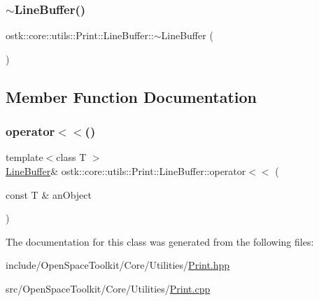 \mbox{\label{classostk_1_1core_1_1utils_1_1_print_1_1_line_buffer_a4e41e82cf1085cdb1db3289b58305526}} 
\subsubsection{\texorpdfstring{$\sim$\+Line\+Buffer()}{~LineBuffer()}}
{\footnotesize\ttfamily ostk\+::core\+::utils\+::\+Print\+::\+Line\+Buffer\+::$\sim$\+Line\+Buffer (\begin{DoxyParamCaption}{ }\end{DoxyParamCaption})}



\subsection{Member Function Documentation}
\mbox{\label{classostk_1_1core_1_1utils_1_1_print_1_1_line_buffer_ac7609b62d8623d0f8717acc4c5102faf}} 
\subsubsection{\texorpdfstring{operator$<$$<$()}{operator<<()}}
{\footnotesize\ttfamily template$<$class T $>$ \\
\hyperlink{classostk_1_1core_1_1utils_1_1_print_1_1_line_buffer}{Line\+Buffer}\& ostk\+::core\+::utils\+::\+Print\+::\+Line\+Buffer\+::operator$<$$<$ (\begin{DoxyParamCaption}\item[{const T \&}]{an\+Object }\end{DoxyParamCaption})\hspace{0.3cm}{\ttfamily [inline]}}



The documentation for this class was generated from the following files\+:\begin{DoxyCompactItemize}
\item 
include/\+Open\+Space\+Toolkit/\+Core/\+Utilities/\hyperlink{_print_8hpp}{Print.\+hpp}\item 
src/\+Open\+Space\+Toolkit/\+Core/\+Utilities/\hyperlink{_print_8cpp}{Print.\+cpp}\end{DoxyCompactItemize}

